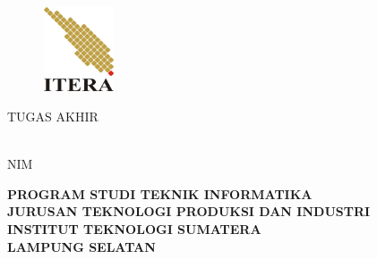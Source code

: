 \clearpage
\pagestyle{empty}

\begin{center}
\smallskip

    \begin{figure}[h]
    	\centering
    	\includegraphics[width=2.1cm, height=2.5cm, keepaspectratio]{figures/itera-logo}
    \end{figure}

	\Large \bfseries \MakeUppercase{\thetitle}
	\vfill

    \Large \uppercase{Tugas Akhir}
    \vfill

    \normalsize \normalfont \theauthor\\
    NIM \printnim
    \vfill

    \large \bfseries
    \uppercase{
        Program Studi Teknik Informatika \\
        Jurusan Teknologi Produksi dan Industri\\
        Institut Teknologi Sumatera\\
        Lampung Selatan
    }\medskip

    \thedate

\end{center}

\clearpage
